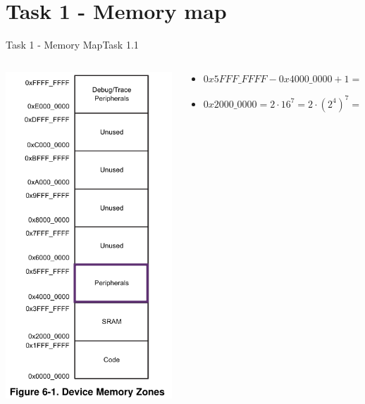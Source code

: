 
\section{Task 1 - Memory map}

\begin{frame}{Task 1 - Memory Map}{Task 1.1}
  \begin{solution}
    \begin{columns}
      \begin{column}{0.2\textwidth}
        \includegraphics[height=0.5\paperheight]{./figures/peripherals.png}
      \end{column}
      \begin{column}{0.8\textwidth}
        \begin{itemize}
          \item $0x5FFF\_FFFF - 0x4000\_0000 + 1 = 0x2000\_0000$
          \item $0x2000\_0000 = 2 \cdot 16^7 = 2 \cdot {(2^4)}^7 = 2 \cdot 2^{4\cdot 7} = 2^{1+28} = 2^{29}$
        \end{itemize}
      \end{column}
    \end{columns}
  \end{solution}
\end{frame}

